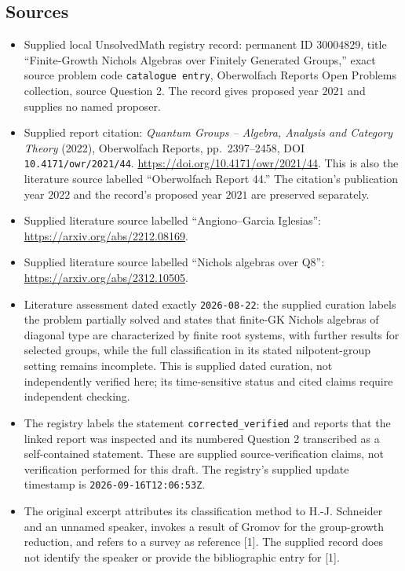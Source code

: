 \documentclass[11pt]{article}
\begin{document}
\subsection{Sources}
\begin{itemize}
\item Supplied local UnsolvedMath registry record: permanent ID \(30004829\), title ``Finite-Growth Nichols Algebras over Finitely Generated Groups,'' exact source problem code \texttt{catalogue entry}, Oberwolfach Reports Open Problems collection, source Question 2. The record gives proposed year \(2021\) and supplies no named proposer.
\item Supplied report citation: \emph{Quantum Groups -- Algebra, Analysis and Category Theory} (2022), Oberwolfach Reports, pp.~2397--2458, DOI \texttt{10.4171/owr/2021/44}. \url{https://doi.org/10.4171/owr/2021/44}. This is also the literature source labelled ``Oberwolfach Report 44.'' The citation's publication year \(2022\) and the record's proposed year \(2021\) are preserved separately.
\item Supplied literature source labelled ``Angiono--Garcia Iglesias'': \url{https://arxiv.org/abs/2212.08169}.
\item Supplied literature source labelled ``Nichols algebras over Q8'': \url{https://arxiv.org/abs/2312.10505}.
\item Literature assessment dated exactly \texttt{2026-08-22}: the supplied curation labels the problem partially solved and states that finite-GK Nichols algebras of diagonal type are characterized by finite root systems, with further results for selected groups, while the full classification in its stated nilpotent-group setting remains incomplete. This is supplied dated curation, not independently verified here; its time-sensitive status and cited claims require independent checking.
\item The registry labels the statement \texttt{corrected\_verified} and reports that the linked report was inspected and its numbered Question 2 transcribed as a self-contained statement. These are supplied source-verification claims, not verification performed for this draft. The registry's supplied update timestamp is \texttt{2026-09-16T12:06:53Z}.
\item The original excerpt attributes its classification method to H.-J. Schneider and an unnamed speaker, invokes a result of Gromov for the group-growth reduction, and refers to a survey as reference [1]. The supplied record does not identify the speaker or provide the bibliographic entry for [1].
\end{itemize}
\end{document}
